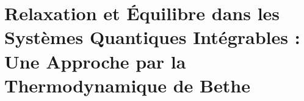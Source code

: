\chapter{Relaxation et Équilibre dans les Systèmes Quantiques Intégrables : Une Approche par la Thermodynamique de Bethe}
\minitoc
%






%


%

%


%



